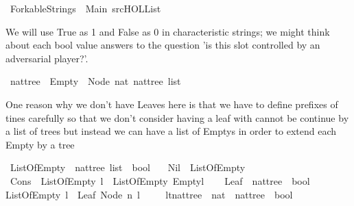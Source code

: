 %
\begin{isabellebody}%
%
%
\isadelimtheory
%
\endisadelimtheory
%
\isatagtheory
{}\isamarkupfalse%
\ Forkable{\isacharunderscore}Strings\ \ Main\ {\isachardoublequoteopen}{\isachartilde}{\isachartilde}{\isacharslash}src{\isacharslash}HOL{\isacharslash}List{\isachardoublequoteclose}\ %
\endisatagtheory
{\isafoldtheory}%
%
\isadelimtheory
%
\endisadelimtheory
%
\begin{isamarkuptext}%
We will use True as 1 and False as 0 in characteristic strings; we might think about each bool
value answers to the question 'is this slot controlled by an adversarial player?'.%
\end{isamarkuptext}\isamarkuptrue%
\isamarkupfalse%
\ nattree\ {\isacharequal}\ Empty\ {\isacharbar}\ Node\ nat\ {\isachardoublequoteopen}nattree\ list{\isachardoublequoteclose}%
\begin{isamarkuptext}%
One reason why we don't have Leaves here is that we have to define prefixes of tines carefully 
so that we don't consider having a leaf with cannot be continue by a list of trees but instead we
can have a list of Emptys in order to extend each Empty by a tree%
\end{isamarkuptext}\isamarkuptrue%
\isamarkupfalse%
\ ListOfEmpty\ {\isacharcolon}{\isacharcolon}\ {\isachardoublequoteopen}nattree\ list\ {\isasymRightarrow}\ bool{\isachardoublequoteclose}\ \isanewline
\ \ Nil\ {\isacharcolon}\ {\isachardoublequoteopen}ListOfEmpty\ {\isacharbrackleft}{\isacharbrackright}{\isachardoublequoteclose}\isanewline
{\isacharbar}\ Cons\ {\isacharcolon}\ {\isachardoublequoteopen}ListOfEmpty\ l\ {\isasymLongrightarrow}\ ListOfEmpty\ {\isacharparenleft}Empty{\isacharhash}l{\isacharparenright}{\isachardoublequoteclose}\isanewline
\ \ \isanewline
{}\isamarkupfalse%
\ Leaf\ {\isacharcolon}{\isacharcolon}\ {\isachardoublequoteopen}nattree\ {\isasymRightarrow}\ bool{\isachardoublequoteclose}\ \isanewline
{\isachardoublequoteopen}ListOfEmpty\ l\ {\isasymLongrightarrow}\ Leaf\ {\isacharparenleft}Node\ n\ l{\isacharparenright}{\isachardoublequoteclose}\ \isanewline
\ \ \isanewline
{}\isamarkupfalse%
\ lt{\isacharunderscore}nat{\isacharunderscore}tree\ {\isacharcolon}{\isacharcolon}\ {\isachardoublequoteopen}nat\ {\isasymRightarrow}\ nattree\ {\isasymRightarrow}\ bool{\isachardoublequoteclose}\ \isanewline

\end{isabellebody}
